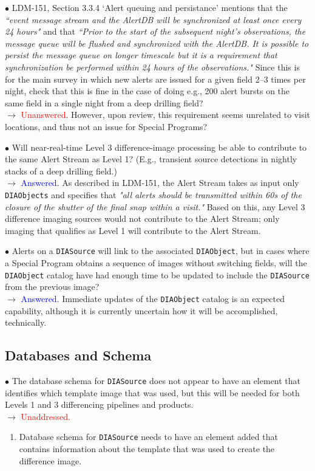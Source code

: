 \documentclass[DM,lsstdraft,toc]{lsstdoc}
\begin{document}
$\bullet$ LDM-151, Section 3.3.4 `Alert queuing and persistance' mentions that the {\it ``event message stream and the AlertDB will be synchronized at least once every 24 hours"} and that {\it ``Prior to the start of the subsequent night's observations, the message queue will be flushed and synchronized with the AlertDB. It is possible to persist the message queue on longer timescale but it is a requirement that synchronization be performed within 24 hours of the observations."} Since this is for the main survey in which new alerts are issued for a given field 2--3 times per night, check that this is fine in the case of doing e.g., 200 alert bursts on the same field in a single night from a deep drilling field? \\
$\rightarrow$  \textcolor{red}{Unanswered.} However, upon review, this requirement seems unrelated to visit locations, and thus not an issue for Special Programs?

$\bullet$ Will near-real-time Level 3 difference-image processing be able to contribute to the same Alert Stream as Level 1? (E.g., transient source detections in nightly stacks of a deep drilling field.) \\
$\rightarrow$ \textcolor{blue}{Answered.} As described in LDM-151, the Alert Stream takes as input only {\tt DIAObjects} and specifies that {\it "all alerts should be transmitted within 60s of the closure of the shutter of the final snap within a visit."} Based on this, any Level 3 difference imaging sources would not contribute to the Alert Stream; only imaging that qualifies as Level 1 will contribute to the Alert Stream.

$\bullet$ Alerts on a {\tt DIASource} will link to the associated {\tt DIAObject}, but in cases where a Special Program obtains a sequence of images without switching fields, will the {\tt DIAObject} catalog have had enough time to be updated to include the {\tt DIASource} from the previous image? \\
$\rightarrow$  \textcolor{blue}{Answered.} Immediate updates of the {\tt DIAObject} catalog is an expected capability, although it is currently uncertain how it will be accomplished, technically. 


\subsection{Databases and Schema}\label{ssec:issues_databases}

$\bullet$ The database schema for {\tt DIASource} does not appear to have an element that identifies which template image that was used, but this will be needed for both Levels 1 and 3 differencing pipelines and products. \\
$\rightarrow$ \textcolor{red}{Unaddressed.}
\begin{enumerate}[resume,topsep=-10pt,label= \textbf{Action \Roman*.}] \item Database schema for {\tt DIASource} needs to have an element added that contains information about the template that was used to create the difference image. \end{enumerate}
\end{document}
